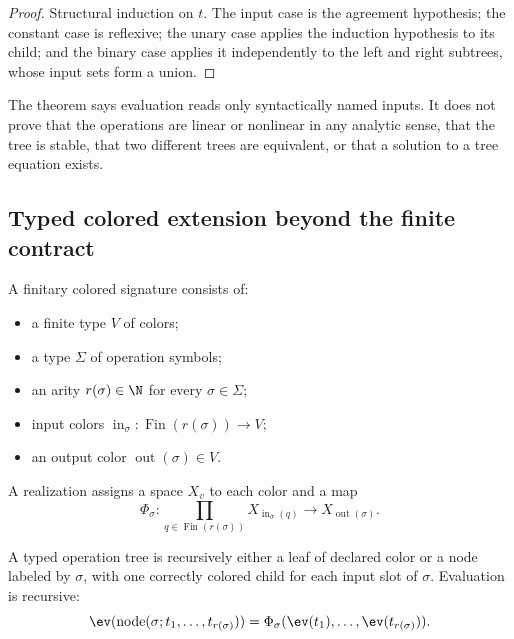 \begin{proof}
Structural induction on $t$.  The input case is the agreement hypothesis;
the constant case is reflexive; the unary case applies the induction
hypothesis to its child; and the binary case applies it independently to the
left and right subtrees, whose input sets form a union.
\end{proof}

\begin{boundary}
The theorem says evaluation reads only syntactically named inputs.  It does
not prove that the operations are linear or nonlinear in any analytic sense,
that the tree is stable, that two different trees are equivalent, or that a
solution to a tree equation exists.
\end{boundary}

\subsection{Typed colored extension beyond the finite contract}

\begin{definition}
\label{def:signature}
A finitary colored signature consists of:
\begin{itemize}
\item a finite type $V$ of colors;
\item a type $\Sigma$ of operation symbols;
\item an arity $r(\sigma)\in\N$ for every $\sigma\in\Sigma$;
\item input colors
$\operatorname{in}_\sigma:\operatorname{Fin}(r(\sigma))\to V$;
\item an output color $\operatorname{out}(\sigma)\in V$.
\end{itemize}
A realization assigns a space $X_v$ to each color and a map
\[
\Phi_\sigma:
\prod_{q\in\operatorname{Fin}(r(\sigma))}X_{\operatorname{in}_\sigma(q)}
\longrightarrow X_{\operatorname{out}(\sigma)}.
\]
\end{definition}

\begin{definition}
\label{def:operation-tree}
A typed operation tree is recursively either a leaf of declared color or a
node labeled by $\sigma$, with one correctly colored child for each input
slot of $\sigma$.  Evaluation is recursive:
\[
\ev(\operatorname{node}(\sigma;t_1,\ldots,t_{r(\sigma)}))
=
\Phi_\sigma(\ev(t_1),\ldots,\ev(t_{r(\sigma)})).
\]
\end{definition}

